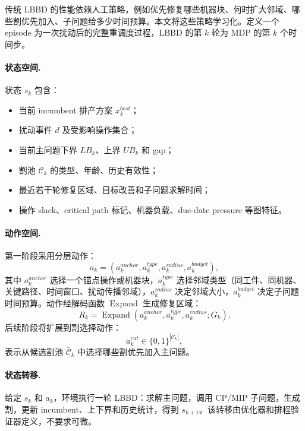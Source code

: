 \documentclass[UTF8,12pt,a4paper]{ctexart}
\newcommand{\Cset}{\mathcal{C}}
\begin{document}
传统 LBBD 的性能依赖人工策略，例如优先修复哪些机器块、何时扩大邻域、哪些割优先加入、子问题给多少时间预算。本文将这些策略学习化。定义一个 episode 为一次扰动后的完整重调度过程，LBBD 的第 $k$ 轮为 MDP 的第 $k$ 个时间步。

\paragraph{状态空间.} 状态 $s_k$ 包含：
\begin{itemize}
    \item 当前 incumbent 排产方案 $x^{best}_k$；
    \item 扰动事件 $d$ 及受影响操作集合；
    \item 当前主问题下界 $LB_k$、上界 $UB_k$ 和 gap；
    \item 割池 $\Cset_k$ 的类型、年龄、历史有效性；
    \item 最近若干轮修复区域、目标改善和子问题求解时间；
    \item 操作 slack、critical path 标记、机器负载、due-date pressure 等图特征。
\end{itemize}

\paragraph{动作空间.} 第一阶段采用分层动作：
\begin{equation}
    a_k=(a_k^{anchor},a_k^{type},a_k^{radius},a_k^{budget}),
\end{equation}
其中 $a_k^{anchor}$ 选择一个锚点操作或机器块，$a_k^{type}$ 选择邻域类型（同工件、同机器、关键路径、时间窗口、扰动传播邻域），$a_k^{radius}$ 决定邻域大小，$a_k^{budget}$ 决定子问题时间预算。动作经解码函数 $\operatorname{Expand}$ 生成修复区域：
\begin{equation}
    R_k = \operatorname{Expand}(a_k^{anchor},a_k^{type},a_k^{radius};G_k).
\end{equation}
后续阶段将扩展到割选择动作：
\begin{equation}
    a_k^{cut}\in\{0,1\}^{|\bar{\Cset}_k|},
\end{equation}
表示从候选割池 $\bar{\Cset}_k$ 中选择哪些割优先加入主问题。

\paragraph{状态转移.} 给定 $s_k$ 和 $a_k$，环境执行一轮 LBBD：求解主问题，调用 CP/MIP 子问题，生成割，更新 incumbent、上下界和历史统计，得到 $s_{k+1}$。该转移由优化器和排程验证器定义，不要求可微。
\end{document}
